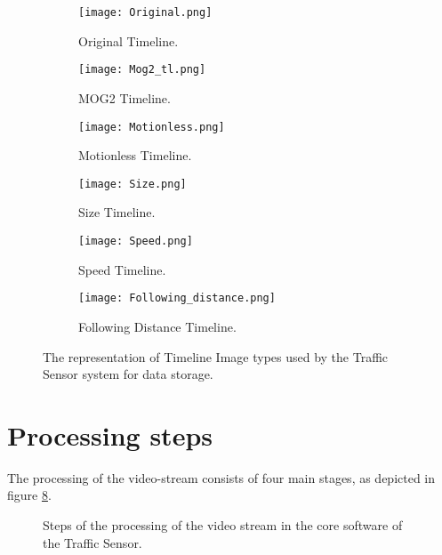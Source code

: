 \begin{figure}[!h]
	\centering
	\begin{subfigure}[!h]{0.9\textwidth}
		\texttt{[image: Original.png]}
		\caption{Original Timeline.\label{fig:original_timeline}}
	\end{subfigure}
	\hfill
	\begin{subfigure}[!h]{0.9\textwidth}
		\texttt{[image: Mog2\_tl.png]}
		\caption{MOG2 Timeline.\label{fig:mog2_timeline}}
	\end{subfigure}
	\hfill
	\begin{subfigure}[!h]{0.9\textwidth}
		\texttt{[image: Motionless.png]}
		\caption{Motionless Timeline. \label{fig:motionless_timeline}}
	\end{subfigure}
	\hfill
	\begin{subfigure}[!h]{0.9\textwidth}
		\texttt{[image: Size.png]}
		\caption{Size Timeline. \label{fig:size_timeline}}
	\end{subfigure}
	\hfill
	\begin{subfigure}[!h]{0.9\textwidth}
		\texttt{[image: Speed.png]}
		\caption{Speed Timeline. \label{fig:speed_timeline}}
	\end{subfigure}
	\hfill
	\begin{subfigure}[!h]{0.9\textwidth}
		\texttt{[image: Following\_distance.png]}
		\caption{Following Distance Timeline. \label{fig:fd_timeline}}
	\end{subfigure}
	\caption{The representation of Timeline Image types used by the Traffic Sensor system for data storage.\label{fig:timeline_types}}
\end{figure}

\section{Processing steps}
The processing of the video-stream consists of four main stages, as depicted in figure \ref{fig:processing_steps}.

\begin{figure}[p]
	\thispagestyle{empty}
	\centering
	\vspace*{-.3in}
	
	\caption{Steps of the processing of the video stream in the core software of the Traffic Sensor.\label{fig:processing_steps}}
\end{figure}

